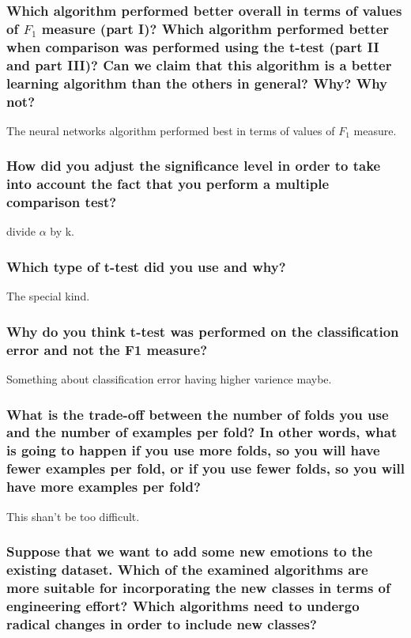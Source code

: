 \documentclass[12pt]{article}
\begin{document}
\subsubsection*{Which algorithm performed better overall in terms of values of $F_1$ measure (part I)? Which algorithm performed better when comparison was performed using the t-test (part II and part III)? Can we claim that this algorithm is a better learning algorithm than the others in general? Why? Why not?}

The neural networks algorithm performed best in terms of values of $F_1$ measure.

\subsubsection*{How did you adjust the significance level in order to take into account the fact that you perform a multiple comparison test?}

divide $\alpha$ by k.

\subsubsection*{Which type of t-test did you use and why?}

The special kind.

\subsubsection*{Why do you think t-test was performed on the classification error and not the F1 measure?}

Something about classification error having higher varience maybe.

\subsubsection*{What is the trade-off between the number of folds you use and the number of examples per fold? In other words, what is going to happen if you use more folds, so you will have fewer examples per fold, or if you use fewer folds, so you will have more examples per fold?}

This shan't be too difficult.

\subsubsection*{Suppose that we want to add some new emotions to the existing dataset. Which of the examined algorithms are more suitable for incorporating the new classes in terms of engineering effort? Which algorithms need to undergo radical changes in order to include new classes?}
\end{document}
